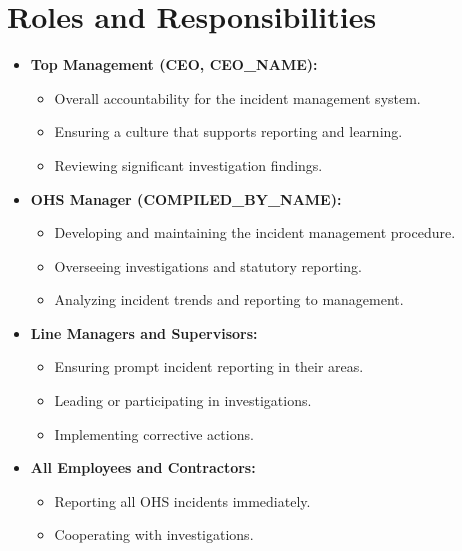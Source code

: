 \documentclass[12pt]{article}
\begin{document}
\section{Roles and Responsibilities}
\begin{itemize}
    \item \textbf{Top Management (CEO, {{CEO_NAME}}):}
    \begin{itemize}
        \item Overall accountability for the incident management system.
        \item Ensuring a culture that supports reporting and learning.
        \item Reviewing significant investigation findings.
    \end{itemize}
    \item \textbf{OHS Manager ({{COMPILED_BY_NAME}}):}
    \begin{itemize}
        \item Developing and maintaining the incident management procedure.
        \item Overseeing investigations and statutory reporting.
        \item Analyzing incident trends and reporting to management.
    \end{itemize}
    \item \textbf{Line Managers and Supervisors:}
    \begin{itemize}
        \item Ensuring prompt incident reporting in their areas.
        \item Leading or participating in investigations.
        \item Implementing corrective actions.
    \end{itemize}
    \item \textbf{All Employees and Contractors:}
    \begin{itemize}
        \item Reporting all OHS incidents immediately.
        \item Cooperating with investigations.
    \end{itemize}
\end{itemize}
\end{document}
